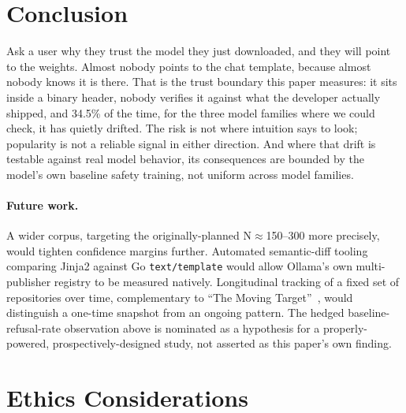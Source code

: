 \documentclass[letterpaper,twocolumn,10pt]{article}
\begin{document}
\section{Conclusion}

Ask a user why they trust the model they just downloaded, and they will point to the weights. Almost nobody points to the chat template, because almost nobody knows it is there. That is the trust boundary this paper measures: it sits inside a binary header, nobody verifies it against what the developer actually shipped, and 34.5\% of the time, for the three model families where we could check, it has quietly drifted. The risk is not where intuition says to look; popularity is not a reliable signal in either direction. And where that drift is testable against real model behavior, its consequences are bounded by the model's own baseline safety training, not uniform across model families.

\paragraph{Future work.} A wider corpus, targeting the originally-planned N$\approx$150--300 more precisely, would tighten confidence margins further. Automated semantic-diff tooling comparing Jinja2 against Go \texttt{text/template} would allow Ollama's own multi-publisher registry to be measured natively. Longitudinal tracking of a fixed set of repositories over time, complementary to ``The Moving Target''~\cite{fan2026moving}, would distinguish a one-time snapshot from an ongoing pattern. The hedged baseline-refusal-rate observation above is nominated as a hypothesis for a properly-powered, prospectively-designed study, not asserted as this paper's own finding.

\section*{Ethics Considerations}
\end{document}
